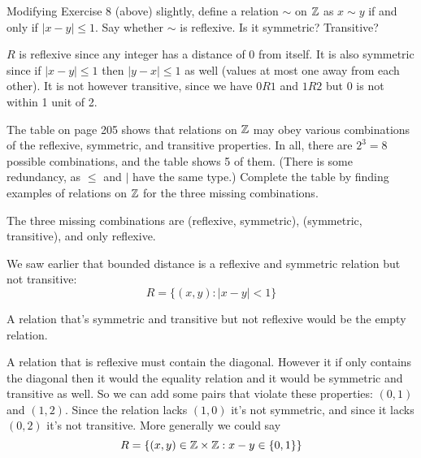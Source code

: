 \documentclass{article}
\begin{document}
\begin{problem}
Modifying Exercise 8 (above) slightly, define a relation $\sim$ on $\mathbb{Z}$ as $x \sim y$ if and only if $|x - y | \leq 1$. Say whether $\sim$ is reflexive. Is it symmetric? Transitive?
\end{problem}

$R$ is reflexive since any integer has a distance of 0 from itself. It is also symmetric since if $|x - y| \leq 1$ then $|y - x| \leq 1$ as well (values at most one away from each other). It is not however transitive, since we have $0R1$ and $1R2$ but 0 is not within 1 unit of 2.

\begin{problem}
The table on page 205 shows that relations on $\mathbb{Z}$ may obey various combinations of the reflexive, symmetric, and transitive properties. In all, there are $2^3 = 8$ possible combinations, and the table shows 5 of them. (There is some redundancy, as $\leq$ and $\mid$ have the same type.) Complete the table by finding examples of relations on $\mathbb{Z}$ for the three missing combinations.
\end{problem}

The three missing combinations are (reflexive, symmetric), (symmetric, transitive), and only reflexive.

We saw earlier that bounded distance is a reflexive and symmetric relation but not transitive:
$$R = \{(x, y): |x - y| < 1\}$$

A relation that's symmetric and transitive but not reflexive would be the empty relation.

A relation that is reflexive must contain the diagonal. However it if only contains the diagonal then it would the equality relation and it would be symmetric and transitive as well. So we can add some pairs that violate these properties: $(0, 1)$ and $(1,2)$. Since the relation lacks $(1, 0)$ it's not symmetric, and since it lacks $(0, 2)$ it's not transitive. More generally we could say
$$R = \{(x, y) \in \mathbb{Z} \times \mathbb{Z}: x - y \in \{0, 1\}\}$$
\end{document}
